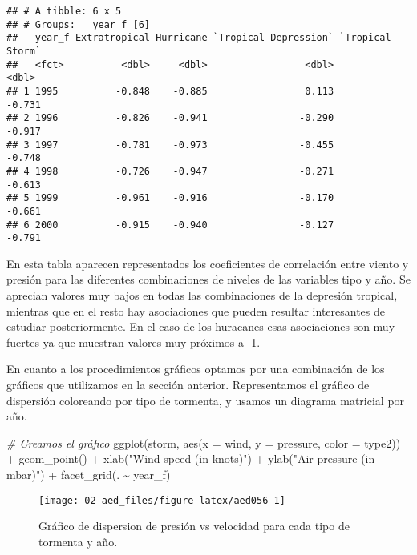 \documentclass[
]{book}
\newenvironment{Shaded}{\begin{snugshade}}{\end{snugshade}}
\newcommand{\AttributeTok}[1]{\textcolor[rgb]{0.77,0.63,0.00}{#1}}
\newcommand{\CommentTok}[1]{\textcolor[rgb]{0.56,0.35,0.01}{\textit{#1}}}
\newcommand{\FunctionTok}[1]{\textcolor[rgb]{0.00,0.00,0.00}{#1}}
\newcommand{\NormalTok}[1]{#1}
\newcommand{\SpecialCharTok}[1]{\textcolor[rgb]{0.00,0.00,0.00}{#1}}
\newcommand{\StringTok}[1]{\textcolor[rgb]{0.31,0.60,0.02}{#1}}
\begin{document}
\begin{verbatim}
## # A tibble: 6 x 5
## # Groups:   year_f [6]
##   year_f Extratropical Hurricane `Tropical Depression` `Tropical Storm`
##   <fct>          <dbl>     <dbl>                 <dbl>            <dbl>
## 1 1995          -0.848    -0.885                 0.113           -0.731
## 2 1996          -0.826    -0.941                -0.290           -0.917
## 3 1997          -0.781    -0.973                -0.455           -0.748
## 4 1998          -0.726    -0.947                -0.271           -0.613
## 5 1999          -0.961    -0.916                -0.170           -0.661
## 6 2000          -0.915    -0.940                -0.127           -0.791
\end{verbatim}

En esta tabla aparecen representados los coeficientes de correlación entre viento y presión para las diferentes combinaciones de niveles de las variables tipo y año. Se aprecian valores muy bajos en todas las combinaciones de la depresión tropical, mientras que en el resto hay asociaciones que pueden resultar interesantes de estudiar posteriormente. En el caso de los huracanes esas asociaciones son muy fuertes ya que muestran valores muy próximos a -1.

En cuanto a los procedimientos gráficos optamos por una combinación de los gráficos que utilizamos en la sección anterior. Representamos el gráfico de dispersión coloreando por tipo de tormenta, y usamos un diagrama matricial por año.

\begin{Shaded}
\begin{Highlighting}[]
\CommentTok{\# Creamos el gráfico}
\FunctionTok{ggplot}\NormalTok{(storm, }\FunctionTok{aes}\NormalTok{(}\AttributeTok{x =}\NormalTok{ wind, }\AttributeTok{y =}\NormalTok{ pressure, }\AttributeTok{color =}\NormalTok{ type2))  }\SpecialCharTok{+}
  \FunctionTok{geom\_point}\NormalTok{() }\SpecialCharTok{+} 
  \FunctionTok{xlab}\NormalTok{(}\StringTok{"Wind speed (in knots)"}\NormalTok{) }\SpecialCharTok{+}
  \FunctionTok{ylab}\NormalTok{(}\StringTok{"Air pressure (in mbar)"}\NormalTok{) }\SpecialCharTok{+}
  \FunctionTok{facet\_grid}\NormalTok{(. }\SpecialCharTok{\textasciitilde{}}\NormalTok{ year\_f) }
\end{Highlighting}
\end{Shaded}

\begin{figure}

{\centering \texttt{[image: 02-aed\_files/figure-latex/aed056-1]} 

}

\caption{Gráfico de dispersion de presión vs velocidad para cada tipo de tormenta y año.}\label{fig:aed056}
\end{figure}
\end{document}
